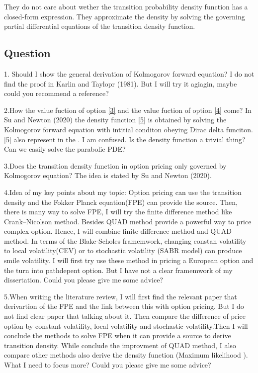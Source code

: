 \documentclass{article}
\numberwithin{equation}{section}
\begin{document}
They do not care about wether the transition probability density function has a closed-form expression. They approximate the density by solving the governing partial differential equations
of the transition density function. 


\subsection*{Question}
1. Should I show the general derivation of Kolmogorov forward equation? I do not find the proof in Karlin and Taylopr (1981). But I will try it agiagin, maybe could you recommend a
reference?

2.How the value fuction of option \eqref{3} and the value fuction of option \eqref{4}  come? In Su and Newton (2020) \cite{Su_2020} the density function \eqref{5} is obtained by solving the 
Kolmogorov forward equation with intitial conditon obeying Dirac delta funciton. \eqref{5} also represent in the \cite{Chen_2014}. I am confused. Is the density function a trivial thing? Can 
we easily solve the parabolic PDE?

3.Does the transition density function in option pricing only governed by Kolmogorov equation? The idea is stated by Su and Newton (2020)\cite{Su_2020}.

4.Idea of my key points about my topic: Option pricing can use the transition density and the Fokker Planck equation(FPE) can provide the source. 
Then, there is many way to solve FPE, I will try the finite difference method like Crank–Nicolson method. Besides QUAD method provide a powerful way to price complex option.
Hence, I will combine finite difference method and QUAD method. In terms of the Blakc-Scholes framemwork, changing constan volatility to local volatility(CEV) or to stochastic volatility (SABR model)
can produce smile volatility. 
I will first try use these method in pricing a European option and the turn into pathdepent option. But I have not a clear framemwork of my dissertation. Could you please give me some advice?

5.When writing the literature review, I will first find the relevant paper that derivartion of the FPE and the link between this with option pricing. But I do not find clear paper that talking about it.
Then compare the difference of price option by constant volatility, local volatility and stochastic volatility.Then I will conclude the methods to solve FPE when it can provide a source to derive transition density. 
While conclude the improvment of QUAD method, I also compare other methods also derive the density function (Maximum likelihood \cite{AtSahalia2007}). What I need to focus more? Could you please give me some advice?



\end{document}

